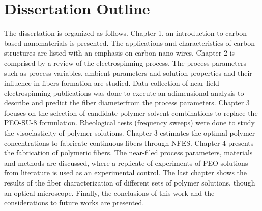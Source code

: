 \section{Dissertation Outline}
The dissertation is organized as follows. Chapter 1, an introduction to carbon-based nanomaterials is presented. The applications and characteristics of carbon structures are listed with an emphasis on carbon nano-wires. Chapter 2 is comprised by a review of the electrospinning process. The process parameters such as process variables, ambient parameters and solution properties and their influence in fibers formation are studied. Data collection of near-field electrospinning publications was done to execute an adimensional analysis to describe and predict the fiber diameterfrom the process parameters. Chapter 3 focuses on the selection of candidate polymer-solvent combinations to replace the PEO-SU-8 formulation. Rheological tests (frequency sweeps) were done to study the visoelasticity of polymer solutions. Chapter 3 estimates the optimal polymer concentrations to fabricate continuous fibers through NFES. Chapter 4 presents the fabrication of polymeric fibers. The near-filed process parameters, materials and methods are discussed, where a replicate of experiments of PEO solutions from literature is used as an experimental control. The last chapter shows the results of the fiber characterization of different sets of polymer solutions, though an optical microscope. Finally, the conclusions of this work and the considerations to future works are presented.